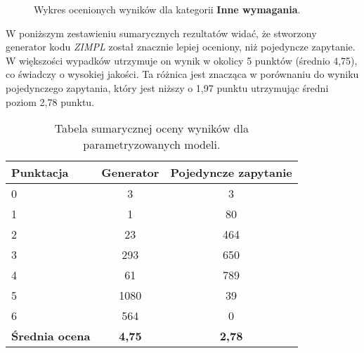 \begin{figure}[H]
\centering
\begin{minipage}{0.45\textwidth}
\centering
{}
\end{minipage}%
\hspace{0.05\textwidth}
\begin{minipage}{0.45\textwidth}
\centering
{}
\end{minipage}
\caption{Wykres ocenionych wyników dla kategorii \textbf{Inne wymagania}.}
\end{figure}

W poniższym zestawieniu sumarycznych rezultatów widać, że stworzony generator kodu  \textit{ZIMPL} został znacznie lepiej oceniony, niż pojedyncze zapytanie. W większości wypadków utrzymuje on wynik w okolicy 5 punktów (średnio 4,75), co świadczy o wysokiej jakości. Ta różnica jest znacząca w porównaniu do wyniku pojedynczego zapytania, który jest niższy o 1,97 punktu utrzymując średni poziom 2,78 punktu.

\begin{table}[ht]
\caption{Tabela sumarycznej oceny wyników dla parametryzowanych modeli.}\label{tab:tabela23}
\centering%
\begin{tabular}{|l|c|c|}
\hline
\textbf{Punktacja} & \textbf{Generator} & \textbf{Pojedyncze zapytanie}\\
\hline
0 & 3 & 3 \\
\hline
1 & 1 & 80 \\
\hline
2 & 23 & 464 \\
\hline
3 & 293 & 650 \\
\hline
4 & 61 & 789 \\
\hline
5 & 1080 & 39 \\
\hline
6 & 564 & 0 \\
\hline
\textbf{Średnia ocena} & \textbf{4,75} & \textbf{2,78} \\
\hline
\end{tabular}
\end{table}

